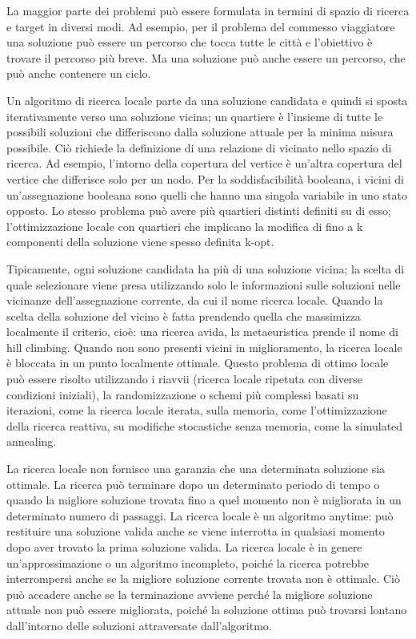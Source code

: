 La maggior parte dei problemi può essere formulata in termini di spazio di ricerca e target in diversi modi. Ad esempio, per il problema del commesso viaggiatore una 
soluzione può essere un percorso che tocca tutte le città e l'obiettivo è trovare il percorso più breve. Ma una soluzione può anche essere un percorso, che può anche 
contenere un ciclo.

Un algoritmo di ricerca locale parte da una soluzione candidata e quindi si sposta iterativamente verso una soluzione vicina; un quartiere è l'insieme di tutte le 
possibili soluzioni che differiscono dalla soluzione attuale per la minima misura possibile. Ciò richiede la definizione di una relazione di vicinato nello spazio 
di ricerca. Ad esempio, l'intorno della copertura del vertice è un'altra copertura del vertice che differisce solo per un nodo. Per la soddisfacibilità booleana, 
i vicini di un'assegnazione booleana sono quelli che hanno una singola variabile in uno stato opposto. Lo stesso problema può avere più quartieri distinti definiti 
su di esso; l'ottimizzazione locale con quartieri che implicano la modifica di fino a k componenti della soluzione viene spesso definita k-opt.

Tipicamente, ogni soluzione candidata ha più di una soluzione vicina; la scelta di quale selezionare viene presa utilizzando solo le informazioni sulle soluzioni 
nelle vicinanze dell'assegnazione corrente, da cui il nome ricerca locale. Quando la scelta della soluzione del vicino è fatta prendendo quella che massimizza 
localmente il criterio, cioè: una ricerca avida, la metaeuristica prende il nome di hill climbing. Quando non sono presenti vicini in miglioramento, 
la ricerca locale è bloccata in un punto localmente ottimale. Questo problema di ottimo locale può essere risolto utilizzando i riavvii (ricerca locale ripetuta 
con diverse condizioni iniziali), la randomizzazione o schemi più complessi basati su iterazioni, come la ricerca locale iterata, sulla memoria, come 
l'ottimizzazione della ricerca reattiva, su modifiche stocastiche senza memoria, come la simulated annealing.

La ricerca locale non fornisce una garanzia che una determinata soluzione sia ottimale. La ricerca può terminare dopo un determinato periodo di tempo o quando la 
migliore soluzione trovata fino a quel momento non è migliorata in un determinato numero di passaggi. La ricerca locale è un algoritmo anytime: può restituire 
una soluzione valida anche se viene interrotta in qualsiasi momento dopo aver trovato la prima soluzione valida. La ricerca locale è in genere un'approssimazione 
o un algoritmo incompleto, poiché la ricerca potrebbe interrompersi anche se la migliore soluzione corrente trovata non è ottimale. Ciò può accadere anche se 
la terminazione avviene perché la migliore soluzione attuale non può essere migliorata, poiché la soluzione ottima può trovarsi lontano dall'intorno delle 
soluzioni attraversate dall'algoritmo.

